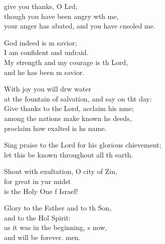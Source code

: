 \settowidth{\versewidth}{Sing praise to the Lord for his glorious achievement; *}
\begin{psalmverse}%
  \begin{patverse}
     give you thanks, O Lrd;\Flex\\
though you have been angry w\pointup{\i}th me,\Med\\
your anger has abated, and you have cnsoled me.

God indeed is m savior;\Med\\
I am confident and unfraid.\\
My strength and my courage is th Lord,\Med\\
and he has been m savior.

With joy you will drw water\Med\\
at the fountain of salvation, and say on tht day:\\
Give thanks to the Lord, acclaim his nme;\Flex\\
among the nations make known h\pointup{\i}s deeds,\Med\\
proclaim how exalted is h\pointup{\i}s name.

Sing praise to the Lord for his glorious chievement;\Med\\
let this be known throughout all th earth.

Shout with exultation, O city of Zin,\Flex\\
for great in yur midst\Med\\
is the Holy One f Israel!

Glory to the Father and to th Son,\Med\\
and to the Hol Spirit:\\
as it was in the beginning, \pointup{\i}s now,\Med\\
and will be forever. men. 
  \end{patverse}
\end{psalmverse}
